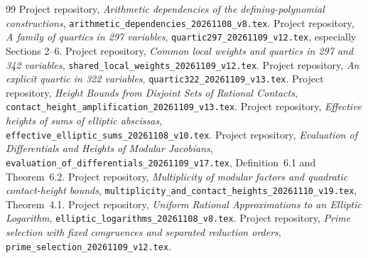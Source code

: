 \documentclass[11pt,a4paper]{article}
\begin{document}
\begingroup\footnotesize
\begin{thebibliography}{99}\setlength{\itemsep}{0pt}
 Project repository,
\emph{Arithmetic dependencies of the defining-polynomial constructions},
\nolinkurl{arithmetic_dependencies_20261108_v8.tex}.
 Project repository,
\emph{A family of quartics in 297 variables},
\nolinkurl{quartic297_20261109_v12.tex}, especially Sections 2--6.
 Project repository,
\emph{Common local weights and quartics in 297 and 342 variables},
\nolinkurl{shared_local_weights_20261109_v12.tex}.
 Project repository,
\emph{An explicit quartic in 322 variables},
\nolinkurl{quartic322_20261109_v13.tex}.
 Project repository,
\emph{Height Bounds from Disjoint Sets of Rational Contacts},
\nolinkurl{contact_height_amplification_20261109_v13.tex}.
 Project repository,
\emph{Effective heights of sums of elliptic abscissas},
\nolinkurl{effective_elliptic_sums_20261108_v10.tex}.
 Project repository,
\emph{Evaluation of Differentials and Heights of Modular Jacobians},
\nolinkurl{evaluation_of_differentials_20261109_v17.tex},
Definition~6.1 and Theorem~6.2.
 Project repository,
\emph{Multiplicity of modular factors and quadratic contact-height bounds},
\nolinkurl{multiplicity_and_contact_heights_20261110_v19.tex},
Theorem~4.1.
 Project repository,
\emph{Uniform Rational Approximations to an Elliptic Logarithm},
\nolinkurl{elliptic_logarithms_20261108_v8.tex}.
 Project repository,
\emph{Prime selection with fixed congruences and separated reduction orders},
\nolinkurl{prime_selection_20261109_v12.tex}.
\end{thebibliography}
\endgroup
\end{document}
